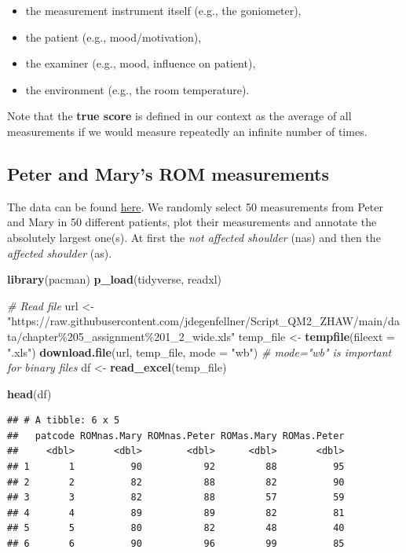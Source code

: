 \documentclass[
]{book}
\newenvironment{Shaded}{\begin{snugshade}}{\end{snugshade}}
\newcommand{\AttributeTok}[1]{\textcolor[rgb]{0.13,0.29,0.53}{#1}}
\newcommand{\CommentTok}[1]{\textcolor[rgb]{0.56,0.35,0.01}{\textit{#1}}}
\newcommand{\FunctionTok}[1]{\textcolor[rgb]{0.13,0.29,0.53}{\textbf{#1}}}
\newcommand{\NormalTok}[1]{#1}
\newcommand{\OtherTok}[1]{\textcolor[rgb]{0.56,0.35,0.01}{#1}}
\newcommand{\StringTok}[1]{\textcolor[rgb]{0.31,0.60,0.02}{#1}}
\providecommand{\tightlist}{%
  \setlength{\itemsep}{0pt}\setlength{\parskip}{0pt}}
\begin{document}
\begin{itemize}
\tightlist
\item
  the measurement instrument itself (e.g., the goniometer),
\item
  the patient (e.g., mood/motivation),
\item
  the examiner (e.g., mood, influence on patient),
\item
  the environment (e.g., the room temperature).
\end{itemize}

Note that the \textbf{true score} is defined in our context as the average of all measurements
if we would measure repeatedly an infinite number of times.

\subsection{Peter and Mary's ROM measurements}\label{peter-and-marys-rom-measurements}

The data can be found \href{http://www.clinimetrics.nl/answers-to-the-assignments-in-textbook_22_0.html}{here}.
We randomly select 50 measurements from Peter and Mary in 50 different patients,
plot their measurements and annotate the absolutely largest one(s). At first the
\emph{not affected shoulder} (nas) and then the \emph{affected shoulder} (as).

\begin{Shaded}
\begin{Highlighting}[]
\FunctionTok{library}\NormalTok{(pacman)}
\FunctionTok{p\_load}\NormalTok{(tidyverse, readxl)}

\CommentTok{\# Read file}
\NormalTok{url }\OtherTok{\textless{}{-}} \StringTok{"https://raw.githubusercontent.com/jdegenfellner/Script\_QM2\_ZHAW/main/data/chapter\%205\_assignment\%201\_2\_wide.xls"}
\NormalTok{temp\_file }\OtherTok{\textless{}{-}} \FunctionTok{tempfile}\NormalTok{(}\AttributeTok{fileext =} \StringTok{".xls"}\NormalTok{)}
\FunctionTok{download.file}\NormalTok{(url, temp\_file, }\AttributeTok{mode =} \StringTok{"wb"}\NormalTok{)  }\CommentTok{\# mode="wb" is important for binary files}
\NormalTok{df }\OtherTok{\textless{}{-}} \FunctionTok{read\_excel}\NormalTok{(temp\_file)}

\FunctionTok{head}\NormalTok{(df)}
\end{Highlighting}
\end{Shaded}

\begin{verbatim}
## # A tibble: 6 x 5
##   patcode ROMnas.Mary ROMnas.Peter ROMas.Mary ROMas.Peter
##     <dbl>       <dbl>        <dbl>      <dbl>       <dbl>
## 1       1          90           92         88          95
## 2       2          82           88         82          90
## 3       3          82           88         57          59
## 4       4          89           89         82          81
## 5       5          80           82         48          40
## 6       6          90           96         99          85
\end{verbatim}
\end{document}
